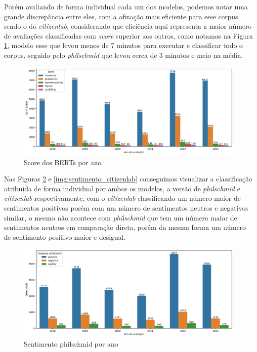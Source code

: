 Porém avaliando de forma individual cada um dos modelos, podemos notar uma grande discrepância entre eles, com a afinação mais eficiente para esse corpus sendo o do \textit{citizenlab}, considerando que eficiência aqui representa a maior número de avaliações classificadas com \textit{score} superior aos outros, como notamos na Figura \ref{img:rinha_de_berts}, modelo esse que levou menos de 7 minutos para executar e classificar todo o corpus, seguido pelo \textit{philschmid} que levou cerca de 3 minutos e meio na média.

\begin{figure}
	\centering
	\includegraphics[width=1\textwidth]{figs/bert/desempenho_berts.png}
	\caption{Score dos BERTs por ano}
	\label{img:rinha_de_berts}
\end{figure}

Nas Figuras \ref{img:sentimento_phil} e \ref{img:sentimento_citizenlab} conseguimos visualizar a classificação atribuída de forma individual por ambos os modelos, a versão de \textit{philschmid} e \textit{citizenlab} respectivamente, com o \textit{citizenlab} classificando um número maior de sentimentos positivos porém com um número de sentimentos neutros e negativos similar, o mesmo não acontece com \textit{philschmid} que tem um número maior de sentimentos neutros em comparação direta, porém da mesma forma um número de sentimento positivo maior e desigual.

\begin{figure}
	\centering
	\centering
	\includegraphics[width=1\textwidth]{figs/bert/classificacao_phil.png}
	\caption{Sentimento philschmid por ano}
	\label{img:sentimento_phil}
\end{figure}

